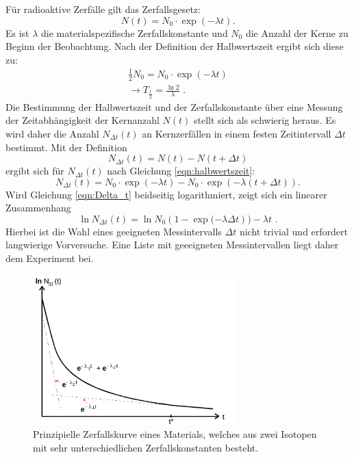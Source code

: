 Für radioaktive Zerfälle gilt das Zerfallsgesetz:
\begin{equation}
  \label{eqn:halbwertszeit}
  N(t)=N_0 \cdot \exp{(-\lambda t)} \text{.}
\end{equation}
Es ist $\lambda$ die materialspezifische Zerfallskonstante und $N_0$ die Anzahl der Kerne zu Beginn der Beobachtung.
Nach der Definition der Halbwertszeit ergibt sich diese zu:
\begin{gather*}
  \frac{1}{2} N_0= N_0 \cdot \exp{(-\lambda t)}\\
  \rightarrow T_{\frac{1}{2}}=\frac{\ln{2}}{\lambda} \text{ .}
\end{gather*}
Die Bestimmung der Halbwertszeit und der Zerfallskonstante über eine Messung der Zeitabhängigkeit der Kernanzahl $N(t)$ stellt sich als schwierig heraus.
Es wird daher die Anzahl $N_{\Delta t}(t)$ an Kernzerfällen in einem festen Zeitintervall $\Delta t$ bestimmt.
Mit der Definition
\begin{equation*}
  N_{\Delta t}(t)=N(t)-N(t+\Delta t)
\end{equation*}
ergibt sich für $N_{\Delta t}(t)$ nach Gleichung \eqref{eqn:halbwertszeit}:
\begin{equation}
  \label{eqn:Delta_t}
  N_{\Delta t}(t)=N_0 \cdot \exp{(-\lambda t)}-N_0 \cdot \exp{(-\lambda(t+\Delta t))} \text{.}
\end{equation}
Wird Gleichung \eqref{eqn:Delta_t} beidseitig logarithmiert, zeigt sich ein linearer Zusammenhang
\begin{equation}
  \label{eqn:ausgleichsrechnung}
  \ln{  N_{\Delta t}(t)}=\ln{N_0 \left(1- \exp{(-\lambda \Delta t}\right))}-\lambda t \text{ .}
\end{equation}
Hierbei ist die Wahl eines geeigneten Messintervalls $\Delta t$ nicht trivial und erfordert langwierige Vorversuche. Eine Liste mit geeeigneten Messintervallen liegt daher dem Experiment bei.
\begin{figure}
  \centering
  \includegraphics[width=0.7\textwidth]{Bilder/zerfallskurve.png}
  \caption{Prinzipielle Zerfallskurve eines Materials, welches aus zwei Isotopen mit sehr unterschiedlichen Zerfallskonstanten besteht.}
  \label{fig:zerfallskurve}
\end{figure}
